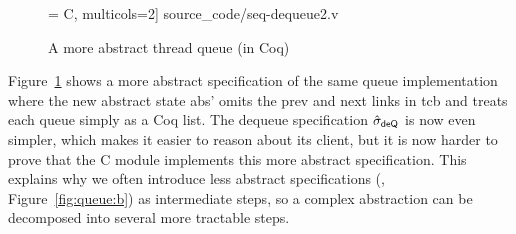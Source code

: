 \begin{figure}\centering
 = C, multicols=2] {source_code/seq-dequeue2.v}
\caption{A more abstract thread queue (in Coq)}
\label{fig:queue2}
\end{figure}

\ignore{
\begin{figure}[t]\scriptsize
$$
\begin{array}{l|l}
\hspace*{-2ex} 
\begin{array}[t]{l}
\verb+Definition tcb := td_state.+\\
\verb++\\
\verb+Definition tdq := List Z.+\\
\verb++\\
\verb+Record abs':={tcbp:ZMap.t tcb;+\\
\verb+              tdqp:ZMap.t tdq}+\\
\end{array}
&
\begin{array}[t]{l}
\verb+Function + \hat{\sigma}_\textsf{dequeue}' \verb+ a i :=+\\ 
\verb+match (a.tdqp i) with+\\
\verb+| h :: q' =>+\\
\verb+  Some(set_tdq a i q', h)+\\
\verb+| nil => None+\\
\verb+end ......+\\
\end{array}
\end{array}
$$ 
\caption{A more abstract queue (in Coq)}
\label{fig:queue2}
\end{figure}
}

Figure~\ref{fig:queue2} shows a more abstract specification of the same
queue implementation where the new abstract state \textsf{abs'} omits
the \textsf{prev} and \textsf{next} links in \textsf{tcb} and treats each
queue simply as a Coq list. The dequeue specification 
$\hat{\sigma}_\textsf{deQ}$ is now
even simpler, which makes it easier to reason about its client,
but it is now harder to prove that the C module
implements this more abstract specification.  This explains why we
often introduce less abstract specifications (\eg,
Figure~\ref{fig:queue:b}) as intermediate steps, so a
complex abstraction can be decomposed into several more tractable steps.


